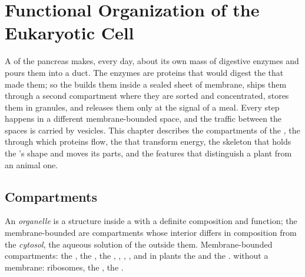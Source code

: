 \chapter{Functional Organization of the Eukaryotic Cell}\label{ch:b1:eukaryotic-cell}

A  of the pancreas makes, every day, about its own mass of digestive
enzymes and pours them into a duct. The enzymes are proteins that would
digest the  that made them; so the  builds them inside a sealed
sheet of membrane, ships them through a second compartment where they
are sorted and concentrated, stores them in granules, and releases them
only at the signal of a meal. Every step happens in a different
membrane-bounded space, and the traffic between the spaces is carried by
vesicles. This chapter describes the compartments of the , the  through which proteins flow, the
 that transform energy, the skeleton that holds the 's
shape and moves its parts, and the features that distinguish a plant
 from an animal one.

\section{Compartments}

\begin{definition}\label{def:b1:eukaryotic-cell:organelle}
An \emph{organelle} is a structure inside a  with
a definite composition and function; the membrane-bounded 
are compartments whose interior differs in composition from the
\emph{cytosol}, the aqueous solution of the 
outside them. Membrane-bounded compartments: the , the
, the , , ,
, and in plants the  and the . 
without a membrane: ribosomes, the , the .
\end{definition}

